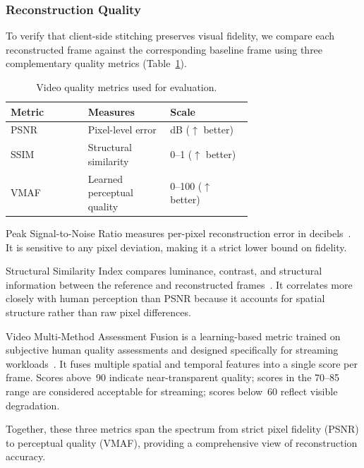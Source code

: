 \subsubsection{Reconstruction Quality}
\label{sec:metricQuality}

To verify that client-side stitching preserves visual fidelity, we compare each reconstructed frame against the corresponding baseline frame using three complementary quality metrics (Table~\ref{tab:VideoQualityMetricSummary}).

\begin{table}[t]
  \centering
  \small
  \caption{Video quality metrics used for evaluation.}
  \label{tab:VideoQualityMetricSummary}
  \setlength{\tabcolsep}{4pt}
  \begin{tabular}{@{}lp{0.34\linewidth}p{0.34\linewidth}@{}}
    \toprule
    \textbf{Metric} & \textbf{Measures} & \textbf{Scale} \\
    \midrule
    PSNR & Pixel-level error & dB ($\uparrow$ better) \\
    SSIM & Structural similarity & 0--1 ($\uparrow$ better) \\
    VMAF & Learned perceptual quality & 0--100 ($\uparrow$ better) \\
    \bottomrule
  \end{tabular}
\end{table}

Peak Signal-to-Noise Ratio measures per-pixel reconstruction error in decibels~\cite{}.
It is sensitive to any pixel deviation, making it a strict lower bound on fidelity.

Structural Similarity Index compares luminance, contrast, and structural information between the reference and reconstructed frames~\cite{}.
It correlates more closely with human perception than PSNR because it accounts for spatial structure rather than raw pixel differences.

Video Multi-Method Assessment Fusion is a learning-based metric trained on subjective human quality assessments and designed specifically for streaming workloads~\cite{}.
It fuses multiple spatial and temporal features into a single score per frame.
Scores above~90 indicate near-transparent quality; scores in the 70--85 range are considered acceptable for streaming; scores below~60 reflect visible degradation.

Together, these three metrics span the spectrum from strict pixel fidelity (PSNR) to perceptual quality (VMAF), providing a comprehensive view of reconstruction accuracy.

